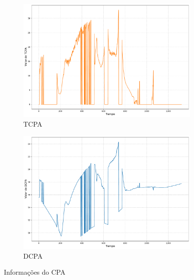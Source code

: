         \begin{figure}[H]
		\centering
		\begin{subfigure}{1\textwidth}
            \centering
            \includegraphics[width=\textwidth]{fig/chap5/crossing_left_tcpa.pdf}
            \caption{TCPA}
            \label{fig:chap5_crossing_left_tcpa}
        \end{subfigure}
        \begin{subfigure}{1\textwidth}
            \centering
            \includegraphics[width=\textwidth]{fig/chap5/crossing_left_dcpa.pdf}
            \caption{DCPA}
            \label{fig:chap5_crossing_left_dcpa}
        \end{subfigure}
        
        \caption{Informações do CPA}
        \label{fig:chap5_crossing_left_cpa}
        \end{figure}
        
